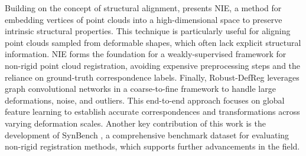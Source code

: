 Building on the concept of structural alignment, \cite{jiang2023neural} presents NIE, a method for embedding vertices of point clouds into a high-dimensional space to preserve intrinsic structural properties. This technique is particularly useful for aligning point clouds sampled from deformable shapes, which often lack explicit structural information. NIE forms the foundation for a weakly-supervised framework for non-rigid point cloud registration, avoiding expensive preprocessing steps and the reliance on ground-truth correspondence labels. Finally, Robust-DefReg \cite{monji2024robust} leverages graph convolutional networks in a coarse-to-fine framework to handle large deformations, noise, and outliers. This end-to-end approach focuses on global feature learning to establish accurate correspondences and transformations across varying deformation scales. Another key contribution of this work is the development of SynBench \cite{DataSynBench}, a comprehensive benchmark dataset for evaluating non-rigid registration methods, which supports further advancements in the field.